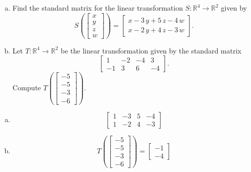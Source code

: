 
\begin{exerciseStatement}

\begin{enumerate}[(a)]
\item Find the standard matrix for the linear transformation \(S:\mathbb{R}^ 4  \to \mathbb{R}^ 2 \) given by \[S\left(  \left[\begin{array}{c}
x \\
y \\
z \\
{w}
\end{array}\right]  \right) =  \left[\begin{array}{c}
x - 3 \, y + 5 \, z - 4 \, {w} \\
x - 2 \, y + 4 \, z - 3 \, {w}
\end{array}\right] .\]
\item Let \(T:\mathbb{R}^ 4  \to \mathbb{R}^ 2 \) be the linear transformation given by the standard matrix \[ \left[\begin{array}{cccc}
1 & -2 & -4 & 3 \\
-1 & 3 & 6 & -4
\end{array}\right] .\] Compute \(T\left( \left[\begin{array}{c}
-5 \\
-5 \\
-3 \\
-6
\end{array}\right]  \right)\). 
\end{enumerate}
    
\end{exerciseStatement}
    
\begin{exerciseAnswer} 

\begin{enumerate}[(a)]
\item \[ \left[\begin{array}{cccc}
1 & -3 & 5 & -4 \\
1 & -2 & 4 & -3
\end{array}\right] \]
\item \[T\left( \left[\begin{array}{c}
-5 \\
-5 \\
-3 \\
-6
\end{array}\right]  \right)= \left[\begin{array}{c}
-1 \\
-4
\end{array}\right] \]
\end{enumerate}
    
\end{exerciseAnswer}
    
